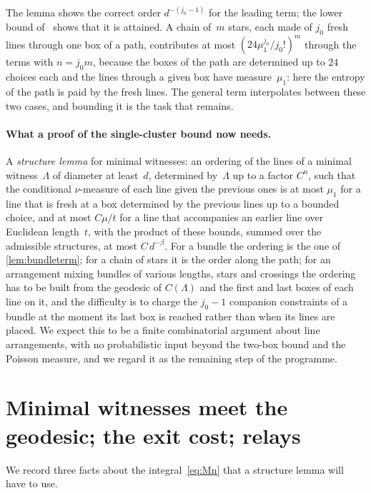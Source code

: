\documentclass[11pt,letterpaper]{article}
\begin{document}
The lemma shows the correct order $d^{-(j_0-1)}$ for the leading term; the lower bound of~\cite[Proposition~4.1]{PS26} shows that it is attained. A chain of~$m$ stars, each made of $j_0$ fresh lines through one box of a path, contributes at most $(24\mu_1^{j_0}/j_0!)^m$ through the terms with $n=j_0m$, because the boxes of the path are determined up to $24$ choices each and the lines through a given box have measure~$\mu_1$: here the entropy of the path is paid by the fresh lines. The general term interpolates between these two cases, and bounding it is the task that remains.

\paragraph{What a proof of the single-cluster bound now needs.} A \emph{structure lemma} for minimal witnesses: an ordering of the lines of a minimal witness~$\Lambda$ of diameter at least~$d$, determined by~$\Lambda$ up to a factor $C^n$, such that the conditional $\nu$-measure of each line given the previous ones is at most $\mu_1$ for a line that is fresh at a box determined by the previous lines up to a bounded choice, and at most $C\mu/t$ for a line that accompanies an earlier line over Euclidean length~$t$, with the product of these bounds, summed over the admissible structures, at most $C\,d^{-\beta}$. For a bundle the ordering is the one of \cref{lem:bundleterm}; for a chain of stars it is the order along the path; for an arrangement mixing bundles of various lengths, stars and crossings the ordering has to be built from the geodesic of $C(\Lambda)$ and the first and last boxes of each line on it, and the difficulty is to charge the $j_0-1$ companion constraints of a bundle at the moment its last box is reached rather than when its lines are placed. We expect this to be a finite combinatorial argument about line arrangements, with no probabilistic input beyond the two-box bound and the Poisson measure, and we regard it as the remaining step of the programme.

\section{Minimal witnesses meet the geodesic; the exit cost; relays}
\label{sec:relay}

We record three facts about the integral~\eqref{eq:Mn} that a structure lemma will have to use.
\end{document}
